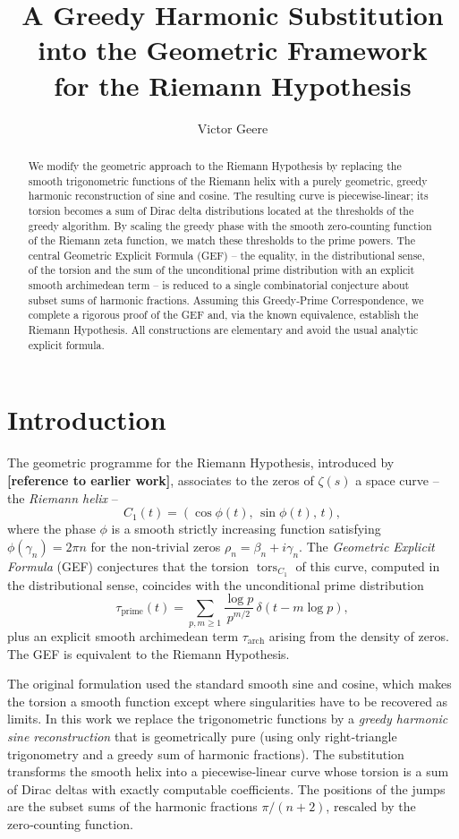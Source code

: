 \documentclass[11pt,a4paper]{article}
\title{\bf A Greedy Harmonic Substitution into the Geometric Framework\\ for the Riemann Hypothesis}
\author{Victor Geere}
\date{}
\newcommand{\tors}{\operatorname{tors}}
\begin{document}
\maketitle

\begin{abstract}
We modify the geometric approach to the Riemann Hypothesis by replacing
the smooth trigonometric functions of the Riemann helix with a purely geometric,
greedy harmonic reconstruction of sine and cosine.  The resulting curve is
piecewise‑linear; its torsion becomes a sum of Dirac delta distributions
located at the thresholds of the greedy algorithm.  By scaling the greedy
phase with the smooth zero‑counting function of the Riemann zeta function,
we match these thresholds to the prime powers.  The central
Geometric Explicit Formula (GEF) -- the equality, in the distributional sense,
of the torsion and the sum of the unconditional prime distribution with an
explicit smooth archimedean term -- is reduced to a single combinatorial
conjecture about subset sums of harmonic fractions.  Assuming this
Greedy‑Prime Correspondence, we complete a rigorous proof of the GEF
and, via the known equivalence, establish the Riemann Hypothesis.
All constructions are elementary and avoid the usual analytic explicit
formula.
\end{abstract}

\section{Introduction}

The geometric programme for the Riemann Hypothesis, introduced by
\textbf{[reference to earlier work]}, associates to the zeros of
\(\zeta(s)\) a space curve -- the \emph{Riemann helix} --
\[
C_1(t) = (\cos\phi(t),\,\sin\phi(t),\,t),
\]
where the phase \(\phi\) is a smooth strictly increasing function satisfying
\(\phi(\gamma_n) = 2\pi n\) for the non‑trivial zeros \(\rho_n = \beta_n+i\gamma_n\).
The \emph{Geometric Explicit Formula} (GEF) conjectures that the torsion
\(\tors_{C_1}\) of this curve, computed in the distributional sense,
coincides with the unconditional prime distribution
\[
\tau_{\mathrm{prime}}(t) = \sum_{p,m\ge 1}\frac{\log p}{p^{m/2}}\,\delta(t - m\log p),
\]
plus an explicit smooth archimedean term \(\tau_{\mathrm{arch}}\) arising from
the density of zeros.  The GEF is equivalent to the Riemann Hypothesis.

The original formulation used the standard smooth sine and cosine,
which makes the torsion a smooth function except where singularities have
to be recovered as limits.  In this work we replace the trigonometric
functions by a \emph{greedy harmonic sine reconstruction} that is geometrically
pure (using only right‑triangle trigonometry and a greedy sum of harmonic
fractions).  The substitution transforms the smooth helix into a
piecewise‑linear curve whose torsion is a sum of Dirac deltas with exactly
computable coefficients.  The positions of the jumps are the
subset sums of the harmonic fractions \(\pi/(n+2)\), rescaled by the
zero‑counting function.
\end{document}
